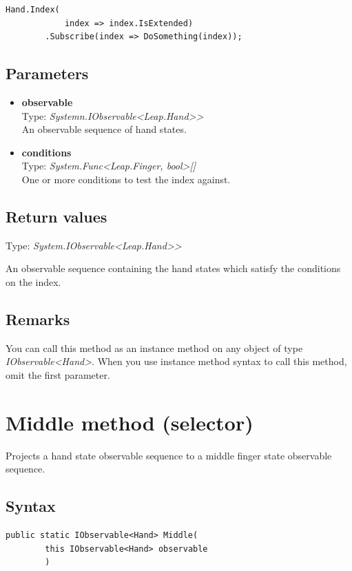 \documentclass[12pt,a4paper,twoside]{report}
\begin{document}
\begin{lstlisting}[caption=Usage example]
    Hand.Index(
            index => index.IsExtended)
        .Subscribe(index => DoSomething(index));
\end{lstlisting}

\subsection{Parameters}

\begin{itemize}
    \item \textbf{observable}\\
        Type: \textit{Systemn.IObservable<Leap.Hand>{}>}\\
        An observable sequence of hand states.
    \item \textbf{conditions}\\
        Type: \textit{System.Func<Leap.Finger, bool>[]}\\
        One or more conditions to test the index against.
\end{itemize}

\subsection{Return values}
Type: \textit{System.IObservable<Leap.Hand>{}>}

An observable sequence containing the hand states which satisfy the conditions on the index.

\subsection{Remarks}
You can call this method as an instance method on any object of type \textit{IObservable<Hand>}. When you use 
instance method syntax to call this method, omit the first parameter.

\section{Middle method (selector)}
Projects a hand state observable sequence to a middle finger state observable sequence.

\subsection{Syntax}
\begin{lstlisting}[caption=Declaration]
    public static IObservable<Hand> Middle(
        this IObservable<Hand> observable
        )
\end{lstlisting}
\end{document}
